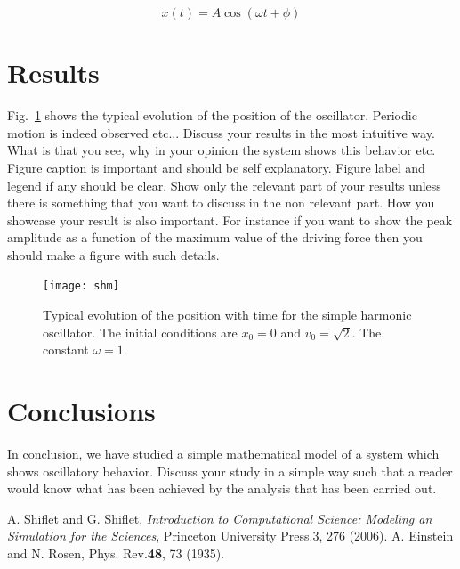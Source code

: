 \documentclass[aps,twocolumn,10pt,reprint]{revtex4}
\newcommand{\be}{\begin{equation}}
\newcommand{\ee}{\end{equation}}
\begin{document}
\be\label{Eq:SHMSol}
x(t) = A \cos\left(\omega t + \phi\right)
\ee


\section{Results}

Fig.~\ref{Fig:shm} shows the typical evolution of the position of the oscillator. Periodic motion is indeed observed etc... Discuss your results in the most intuitive way. What is that you see, why in your opinion the system shows this behavior etc. Figure caption is important and should be self explanatory. Figure label and legend if any should be clear. Show only the relevant part of your results unless there is something that you want to discuss in the non relevant part. How you showcase your result is also important. For instance if you want to show the peak amplitude as a function of the maximum value of the driving force then you should make a figure with such details.
\begin{figure}[!h]
\centering
\texttt{[image: shm]}~
\caption{Typical evolution of the position with time for the simple harmonic oscillator. The initial conditions are $x_{0} = 0$ and $v_{0} = \sqrt{2}$. The constant $\omega =1$.}\label{Fig:shm}
\end{figure}
\section{Conclusions}
In conclusion, we have studied a simple mathematical model of a system which shows oscillatory behavior. Discuss your study in a simple way such that a reader would know what has been achieved by the analysis that has been carried out. 

\begin{thebibliography}{}
 A. Shiflet and G. Shiflet, {\it Introduction to Computational Science: Modeling an Simulation for the Sciences}, Princeton University Press.3, 276 (2006).
 A. Einstein and N. Rosen, Phys. Rev.{\bf 48}, 73 (1935).
\end{thebibliography}
\end{document}
